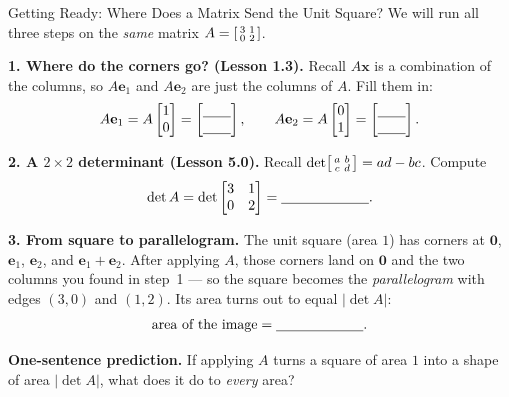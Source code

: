\documentclass[10pt]{article}
\newcommand{\ee}{\mathbf{e}}
\begin{document}
\namedateperiod

\vspace{0.12in}

\begin{notesbox}{Getting Ready: Where Does a Matrix Send the Unit Square?}
\small We will run all three steps on the \emph{same} matrix
$A=\begin{bsmallmatrix} 3 & 1 \\ 0 & 2 \end{bsmallmatrix}$.

\vspace{4pt}
\textbf{1. Where do the corners go? (Lesson 1.3).} Recall $A\mathbf{x}$ is a combination of the columns,
so $A\ee_1$ and $A\ee_2$ are just the columns of $A$. Fill them in:
\[
  A\ee_1=A\begin{bmatrix} 1 \\ 0 \end{bmatrix}=\begin{bmatrix} \blank{0.7cm} \\ \blank{0.7cm} \end{bmatrix},
  \qquad
  A\ee_2=A\begin{bmatrix} 0 \\ 1 \end{bmatrix}=\begin{bmatrix} \blank{0.7cm} \\ \blank{0.7cm} \end{bmatrix}.
\]

\vspace{4pt}
\textbf{2. A $2\times2$ determinant (Lesson 5.0).} Recall
$\det\begin{bsmallmatrix} a & b\\ c & d \end{bsmallmatrix}=ad-bc$. Compute
\[
  \det A = \det\begin{bmatrix} 3 & 1 \\ 0 & 2 \end{bmatrix} = \blank{2.2cm}.
\]

\vspace{4pt}
\textbf{3. From square to parallelogram.} The unit square (area $1$) has corners at $\mathbf{0}$,
$\ee_1$, $\ee_2$, and $\ee_1+\ee_2$. After applying $A$, those corners land on $\mathbf{0}$ and the two
columns you found in step~1 --- so the square becomes the \emph{parallelogram} with edges $(3,0)$ and
$(1,2)$. Its area turns out to equal $|\det A|$:
\[
  \text{area of the image} = \blank{2.2cm}.
\]

\vspace{4pt}
\textbf{One-sentence prediction.} If applying $A$ turns a square of area $1$ into a shape of area
$|\det A|$, what does it do to \emph{every} area? \writeline
\end{notesbox}
\end{document}
